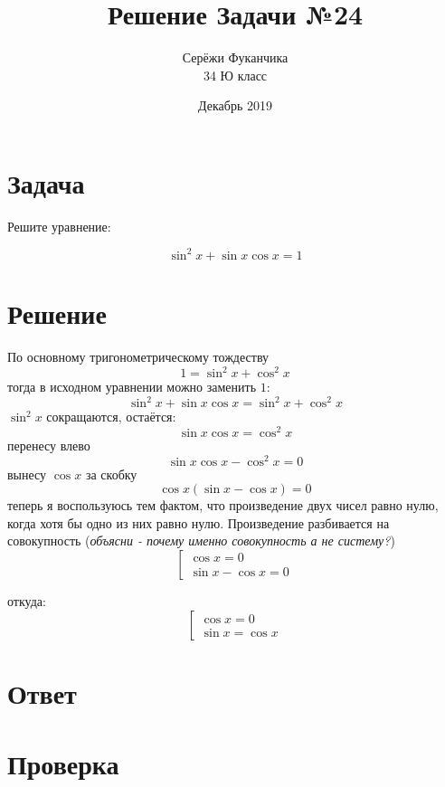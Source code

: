 \documentclass{article}
\title{Решение Задачи №24}
\author{Серёжи Фуканчика\\34 Ю класс}
\date{Декабрь 2019}
\begin{document}
\maketitle

\section{Задача}
Решите уравнение:

$$\sin^2{}x + \sin{}x{}\cos{}x = 1$$

\section{Решение}
По основному тригонометрическому тождеству
$$1=\sin^2{x}+\cos^2{x}$$
тогда в исходном уравнении можно заменить $1$:
$$\sin^2{}x + \sin{}x{}\cos{}x = \sin^2{x}+\cos^2{x}$$
$\sin^2{x}$ сокращаются, остаётся:
$$\sin{}x{}\cos{}x = \cos^2{x}$$
перенесу влево
$$\sin{}x{}\cos{}x - \cos^2{x}=0$$
вынесу $\cos{x}$ за скобку
$$\cos{}x(\sin{}x - \cos{x}) = 0$$
теперь я воспользуюсь тем фактом, что произведение двух чисел равно нулю, когда хотя бы одно из них равно нулю. Произведение разбивается на совокупность (\textit{объясни - почему именно совокупность а не систему?})
\begin{equation*}
\left[
\begin{array}{l}
\cos{}x  = 0 \\
\sin{}x - \cos{}x = 0
\end{array}
\right.
\end{equation*}

откуда:
\begin{equation*}
\left[
\begin{array}{l}
\cos{}x  = 0 \\
\sin{}x = \cos{}x
\end{array}
\right.
\end{equation*}

\section{Ответ}

\section{Проверка}
\end{document}

